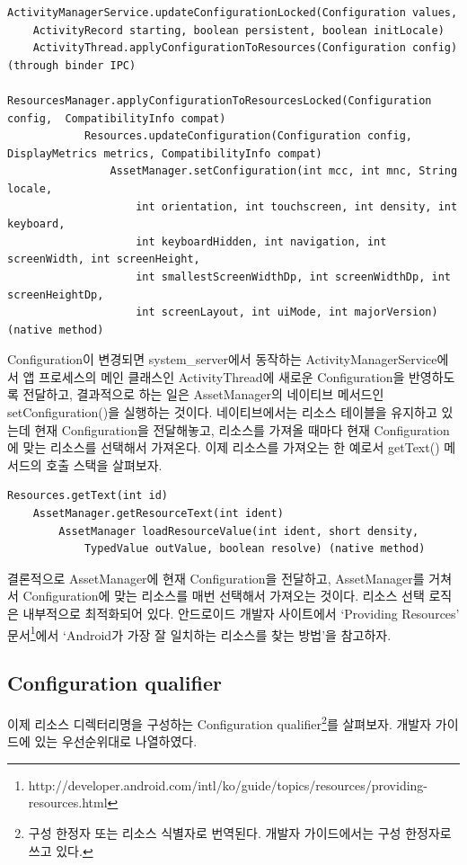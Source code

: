 \begin{lstlisting}[frame=single]
ActivityManagerService.updateConfigurationLocked(Configuration values,
	ActivityRecord starting, boolean persistent, boolean initLocale)
	ActivityThread.applyConfigurationToResources(Configuration config) (through binder IPC)
		ResourcesManager.applyConfigurationToResourcesLocked(Configuration config, 	CompatibilityInfo compat)
			Resources.updateConfiguration(Configuration config, DisplayMetrics metrics, CompatibilityInfo compat)
				AssetManager.setConfiguration(int mcc, int mnc, String locale,
            		int orientation, int touchscreen, int density, int keyboard,
            		int keyboardHidden, int navigation, int screenWidth, int screenHeight,
            		int smallestScreenWidthDp, int screenWidthDp, int screenHeightDp,
            		int screenLayout, int uiMode, int majorVersion) (native method)
\end{lstlisting}
\lstset{basicstyle=\ttfamily\small}
Configuration이 변경되면 system\_server에서 동작하는 ActivityManagerService에서 앱 프로세스의 메인 클래스인 ActivityThread에 새로운 Configuration을 반영하도록 전달하고, 결과적으로 하는 일은 AssetManager의 네이티브 메서드인 setConfiguration()을 실행하는 것이다. 네이티브에서는 리소스 테이블을 유지하고 있는데 현재 Configuration을 전달해놓고, 리소스를 가져올 때마다 현재 Configuration에 맞는 리소스를 선택해서 가져온다.
이제 리소스를 가져오는 한 예로서 getText() 메서드의 호출 스택을 살펴보자.
\begin{lstlisting}[frame=single]
Resources.getText(int id)
	AssetManager.getResourceText(int ident)
		AssetManager loadResourceValue(int ident, short density,
			TypedValue outValue, boolean resolve) (native method)
\end{lstlisting}
결론적으로 AssetManager에 현재 Configuration을 전달하고, AssetManager를 거쳐서 Configuration에 맞는 리소스를 매번 선택해서 가져오는 것이다. 리소스 선택 로직은 내부적으로 최적화되어 있다. 안드로이드 개발자 사이트에서 `Providing Resources' 문서\footnote{http://developer.android.com/intl/ko/guide/topics/resources/providing-resources.html}에서 `Android가 가장 잘 일치하는 리소스를 찾는 방법'을 참고하자.\\


\subsection{Configuration qualifier}
이제 리소스 디렉터리명을 구성하는 Configuration qualifier\footnote{구성 한정자 또는 리소스 식별자로 번역된다. 개발자 가이드에서는 구성 한정자로 쓰고 있다.}를 살펴보자. 개발자 가이드에 있는 우선순위대로 나열하였다.\\

